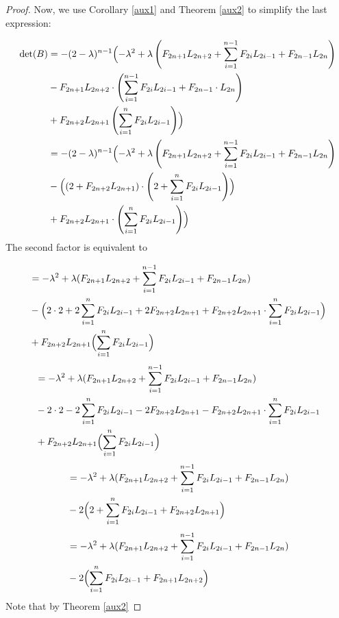\documentclass[11pt]{birkjour}
\theoremstyle{definition}
\theoremstyle{remark}
\numberwithin{equation}{section}
\begin{document}
\begin{proof}
\noindent Now, we use Corollary \ref{aux1} and Theorem \ref{aux2} to simplify the last expression: 

\begin{align*}
\operatorname{det}(B)&=-(2-\lambda)^{n-1} \Bigl( -\lambda^2+\lambda\left(F_{2 n+1} L_{2 n+2}+\sum_{i=1}^{n-1} F_{2 i} L_{2 i-1}+F_{2 n-1} L_{2 n}\right)\\
&-F_{2 n+1} L_{2 n+2} \cdot\left(\sum_{i=1}^{n-1} F_{2 i} L_{2 i-1}+F_{2 n-1} \cdot L_{2 n}\right)\\ 
&+F_{2 n+2} L_{2 n+1}\left(\sum_{i=1}^n F_{2 i} L_{2 i-1}\right)\Bigr)\\
&= -(2-\lambda)^{n-1} \Bigl(-\lambda^2+\lambda\left(F_{2 n+1} L_{2 n+2}+\sum_{i=1}^{n-1} F_{2i} L_{2 i-1}+F_{2 n-1} L_{2 n}\right)\\
&-\Bigl(\left(2+F_{2 n+2} L_{2 n+1}\right) \cdot\left(2+\sum_{i=1}^n F_{2 i} L_{2 i-1}\right)\Bigr) \\
&  +F_{2 n+2} L_{2 n+1} \cdot\left(\sum_{i=1}^n F_{2 i} L_{2 i-1}\right)\Bigr)
\end{align*}
\normalcolor
The second factor is equivalent to 

\begin{align*}
&=-\lambda^2+\lambda(F_{2n+1}L_{2n+2}+\sum_{i=1}^{n-1}F_{2i}L_{2i-1}+F_{2n-1}L_{2n})\\
&-\Bigl(2\cdot2+2\sum_{i=1}^{n}F_{2i}L_{2i-1}+2F_{2n+2}L_{2n+1}+F_{2n+2}L_{2n+1}\cdot\sum_{i=1}^{n}F_{2i}L_{2i-1}\Bigr)\\
&+F_{2n+2}L_{2n+1}\Bigl(\sum_{i=1}^{n}F_{2i}L_{2i-1}\Bigr)
\end{align*}
\begin{align*}
&=-\lambda^2+\lambda(F_{2n+1}L_{2n+2}+\sum_{i=1}^{n-1}F_{2i}L_{2i-1}+F_{2n-1}L_{2n})\\
&-2\cdot2-2\sum_{i=1}^{n}F_{2i}L_{2i-1}-2F_{2n+2}L_{2n+1}-F_{2n+2}L_{2n+1}\cdot\sum_{i=1}^{n}F_{2i}L_{2i-1}\\
&+F_{2n+2}L_{2n+1}\Bigl(\sum_{i=1}^{n}F_{2i}L_{2i-1}\Bigr)
\end{align*}
\begin{align*}
&=-\lambda^2+\lambda(F_{2n+1}L_{2n+2}+\sum_{i=1}^{n-1}F_{2i}L_{2i-1}+F_{2n-1}L_{2n})\\
&-2\Bigl( 2+\sum_{i=1}^{n}F_{2i}L_{2i-1}+F_{2n+2}L_{2n+1}\Bigr)
\end{align*}
\begin{align*}
&=-\lambda^2+\lambda(F_{2n+1}L_{2n+2}+\sum_{i=1}^{n-1}F_{2i}L_{2i-1}+F_{2n-1}L_{2n})\\
&-2\Bigl( \sum_{i=1}^{n}F_{2i}L_{2i-1}+F_{2n+1}L_{2n+2}\Bigr)
\end{align*}
\noindent Note that by Theorem \ref{aux2} 


\end{proof}
\end{document}
